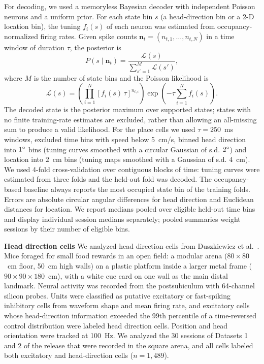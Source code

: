 \documentclass[11pt]{article}
\begin{document}
For decoding, we used a memoryless Bayesian decoder with independent Poisson neurons and a uniform prior. For each state bin $s$ (a head-direction bin or a 2-D location bin), the tuning $f_i(s)$ of each neuron was estimated from occupancy-normalized firing rates. Given spike counts $\mathbf{n}_t = (n_{t,1}, \dots, n_{t, N})$ in a time window of duration $\tau$, the posterior is
\begin{equation}
P(s \mid \mathbf{n}_t) = \frac{\mathcal{L}(s)}{\sum_{s'=1}^{M} \mathcal{L}(s')},
\label{eq:posterior}
\end{equation}
where $M$ is the number of state bins and the Poisson likelihood is
\begin{equation}
\mathcal{L}(s) = \left(\prod_{i=1}^{N} \left[f_i(s)\,\tau\right]^{n_{t,i}}\right) \exp\!\left(-\tau \sum_{i=1}^{N} f_i(s)\right).
\label{eq:likelihood}
\end{equation}
The decoded state is the posterior maximum over supported states; states with no finite training-rate estimates are excluded, rather than allowing an all-missing sum to produce a valid likelihood. For the place cells we used $\tau=250$~ms windows, excluded time bins with speed below 5~cm/s, binned head direction into $1\degree$ bins (tuning curves smoothed with a circular Gaussian of s.d. $2\degree$) and location into $2$~cm bins (tuning maps smoothed with a Gaussian of s.d. $4$~cm). We used 4-fold cross-validation over contiguous blocks of time: tuning curves were estimated from three folds and the held-out fold was decoded. The occupancy-based baseline always reports the most occupied state bin of the training folds. Errors are absolute circular angular differences for head direction and Euclidean distances for location. We report medians pooled over eligible held-out time bins and display individual session medians separately; pooled summaries weight sessions by their number of eligible bins.

{\bf Head direction cells}
We analyzed head direction cells from Duszkiewicz et al.~\cite{Duszkiewicz2024}. Mice foraged for small food rewards in an open field: a modular arena ($80 \times 80$~cm floor, 50~cm high walls) on a plastic platform inside a larger metal frame ($90 \times 90 \times 180$~cm), with a white cue card on one wall as the main distal landmark. Neural activity was recorded from the postsubiculum with 64-channel silicon probes. Units were classified as putative excitatory or fast-spiking inhibitory cells from waveform shape and mean firing rate, and excitatory cells whose head-direction information exceeded the 99th percentile of a time-reversed control distribution were labeled head direction cells. Position and head orientation were tracked at 100~Hz. We analyzed the 30 sessions of Datasets 1 and 2 of the release that were recorded in the square arena, and all cells labeled both excitatory and head-direction cells ($n=1{,}489$).
\end{document}
